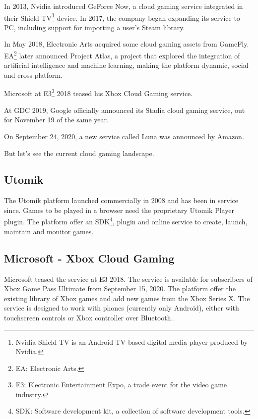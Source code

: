 In 2013, Nvidia introduced GeForce Now, a cloud gaming service integrated in their Shield TV\footnote{Nvidia Shield TV is an Android TV-based digital media player produced by Nvidia.} device. In 2017, the company began expanding its service to PC, including support for importing a user's Steam library.

In May 2018, Electronic Arts acquired some cloud gaming assets from GameFly. EA\footnote{EA: Electronic Arts.} later announced Project Atlas, a project that explored the integration of artificial intelligence and machine learning, making the platform dynamic, social and cross platform.

Microsoft at E3\footnote{E3: Electronic Entertainment Expo, a trade event for the video game industry.} 2018 teased his Xbox Cloud Gaming service.

At GDC 2019, Google officially announced its Stadia cloud gaming service, out for November 19 of the same year.

On September 24, 2020, a new service called Luna was announced by Amazon\cite{Cloud_gaming_history}.

But let's see the current cloud gaming landscape.

\subsection{Utomik}
The Utomik platform launched commercially in 2008 and has been in service since. Games to be played in a browser need the proprietary Utomik Player plugin. The platform offer an SDK\footnote{SDK: Software development kit, a collection of software development tools.}, plugin and online service to create, launch, maintain and monitor games\cite{Utomik}.

\subsection{Microsoft - Xbox Cloud Gaming}
Microsoft teased the service at E3 2018. The service is available for subscribers of Xbox Game Pass Ultimate from September 15, 2020. The platform offer the existing library of Xbox games and add new games from the Xbox Series X. The service is designed to work with phones (currently only Android), either with touchscreen controls or Xbox controller over Bluetooth.\cite{Xbox_Game_Pass_cloud_gaming}.

